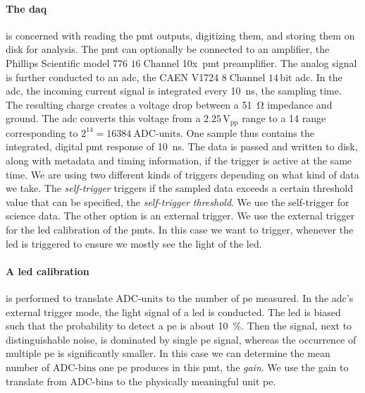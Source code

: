 \paragraph{The \gls{daq}} is concerned with reading the \gls{pmt} outputs, digitizing them, and storing them on disk for analysis.
The \gls{pmt} can optionally be connected to an amplifier, the Phillips Scientific model 776 $ 16\;\mathrm{Channel} $ 10x~\gls{pmt} preamplifier.
The analog signal is further conducted to an \gls{adc}, the CAEN V1724 $ 8\;\mathrm{Channel} $ $ 14\,\mathrm{bit} $ \gls{adc}.
In the \gls{adc}, the incoming current signal is integrated every \SI{10}{\nano\s}, the sampling time.
The resulting charge creates a voltage drop between a \SI{51}{\ohm} impedance and ground.
The \gls{adc} converts this voltage from a $ 2.25\,\mathrm{V}_\mathrm{pp} $ range to a \SI{14}{} range corresponding to $ 2^{14} = \SI{16384}{\mathrm{ADC\mbox{-}units}} $.
One sample thus contains the integrated, digital \gls{pmt} response of \SI{10}{\nano\second}.
The data is passed and written to disk, along with metadata and timing information, if the trigger is active at the same time.
We are using two different kinds of triggers depending on what kind of data we take.
The \emph{self-trigger} triggers if the sampled data exceeds a certain threshold value that can be specified, the \emph{self-trigger threshold}.
We use the self-trigger for science data.
The other option is an external trigger.
We use the external trigger for the \gls{led} calibration of the \glspl{pmt}.
In this case we want to trigger, whenever the \gls{led} is triggered to ensure we mostly see the light of the \gls{led}.



\paragraph{A \gls{led} calibration} is performed to translate $ \mathrm{ADC\mbox{-}units} $ to the number of \gls{pe} measured.
In the \gls{adc}'s external trigger mode, the light signal of a \gls{led} is conducted.
The \gls{led} is biased such that the probability to detect a \gls{pe} is about \SI{10}{\%}.
Then the signal, next to distinguishable noise, is dominated by single \gls{pe} signal, whereas the occurrence of multiple \gls{pe} is significantly smaller.
In this case we can determine the mean number of $ \mathrm{ADC\mbox{-}bins} $ one \gls{pe} produces in this \gls{pmt}, the \emph{gain}.
We use the gain to translate from $ \mathrm{ADC\mbox{-}bins} $ to the physically meaningful unit \gls{pe}.



